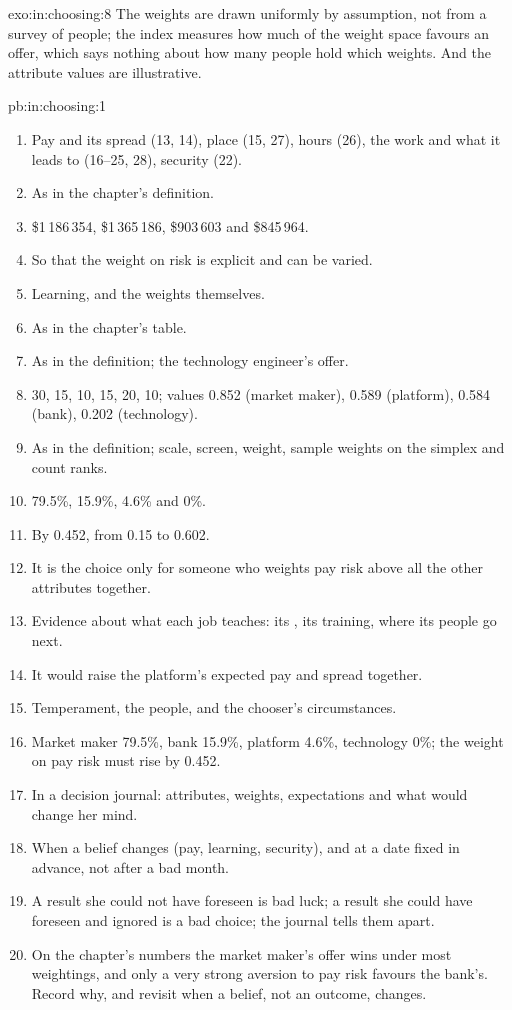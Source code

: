 \begin{solution}{exo:in:choosing:8}
The weights are drawn uniformly by assumption, not from a survey of people; the index measures how much of the weight
space favours an offer, which says nothing about how many people hold which weights. And the attribute values are
illustrative.
\end{solution}

\begin{solution}{pb:in:choosing:1}
\begin{enumerate}
\item Pay and its spread (13, 14), place (15, 27), hours (26), the work and what it leads to (16--25, 28), security (22).
\item As in the chapter's definition.
\item \$1\,186\,354, \$1\,365\,186, \$903\,603 and \$845\,964.
\item So that the weight on risk is explicit and can be varied.
\item Learning, and the weights themselves.
\item As in the chapter's table.
\item As in the definition; the technology engineer's offer.
\item 30, 15, 10, 15, 20, 10; values 0.852 (market maker), 0.589 (platform), 0.584 (bank), 0.202 (technology).
\item As in the definition; scale, screen, weight, sample weights on the simplex and count ranks.
\item 79.5\%, 15.9\%, 4.6\% and 0\%.
\item By 0.452, from 0.15 to 0.602.
\item It is the choice only for someone who weights pay risk above all the other attributes together.
\item Evidence about what each job teaches: its , its training, where its people go next.
\item It would raise the platform's expected pay and spread together.
\item Temperament, the people, and the chooser's circumstances.
\item Market maker 79.5\%, bank 15.9\%, platform 4.6\%, technology 0\%; the weight on pay risk must rise by 0.452.
\item In a decision journal: attributes, weights, expectations and what would change her mind.
\item When a belief changes (pay, learning, security), and at a date fixed in advance, not after a bad month.
\item A result she could not have foreseen is bad luck; a result she could have foreseen and ignored is a bad choice; the
journal tells them apart.
\item On the chapter's numbers the market maker's offer wins under most weightings, and only a very strong aversion to
pay risk favours the bank's. Record why, and revisit when a belief, not an outcome, changes.
\end{enumerate}
\end{solution}

